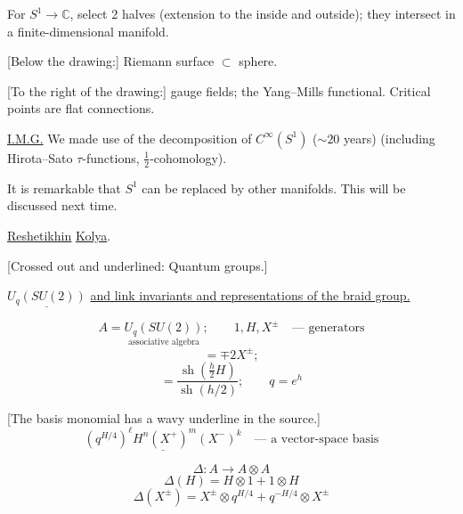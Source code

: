 For $S^1\to\mathbb C$, select 2 halves (extension to the inside and outside);
they intersect in a finite-dimensional manifold.



[Below the drawing:] Riemann surface $\subset$ sphere.

[To the right of the drawing:] gauge fields; the Yang--Mills functional.
Critical points are flat connections.

\underline{I.M.G.} We made use of the decomposition of $C^\infty(S^1)$ ($\sim20$ years)
(including Hirota--Sato $\tau$-functions, $\frac12$-cohomology).

It is remarkable that $S^1$ can be replaced by other manifolds.
This will be discussed next time.

\underline{\underline{Reshetikhin}} \underline{Kolya}.

[Crossed out and underlined: Quantum groups.]

$\underline{U_q(SU(2))}$ \underline{and link invariants and representations of the braid group.}

\begin{equation*}
A=\underset{\text{associative algebra}}{U_q(SU(2))};\qquad
1,H,X^\pm\quad\text{--- generators}
\end{equation*}
\begin{equation*}
[X^\pm,H]=\mp2X^\pm;
\tag{1}
\end{equation*}
\begin{equation*}
[X^+,X^-]=\frac{\operatorname{sh}\left(\frac h2 H\right)}{\operatorname{sh}(h/2)};
\qquad q=e^h
\end{equation*}

[The basis monomial has a wavy underline in the source.]
\begin{equation*}
\underline{\left(q^{H/4}\right)^\ell H^n(X^+)^m(X^-)^k}
\quad\text{--- a vector-space basis}
\tag{2}
\end{equation*}

\begin{equation*}
\Delta:A\to A\otimes A
\end{equation*}
\begin{equation*}
\Delta(H)=H\otimes1+1\otimes H
\tag{3}
\end{equation*}
\begin{equation*}
\Delta(X^\pm)=X^\pm\otimes q^{H/4}+q^{-H/4}\otimes X^\pm
\end{equation*}


